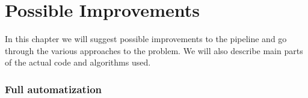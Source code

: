 \chapter[Possible Improvements]{Possible Improvements}
\label{kap:improvements}

In this chapter we will suggest possible improvements to the pipeline and go through the various approaches to the problem. 
We will also describe main parts of the actual code and algorithms used. 

\subsection{Full automatization}

